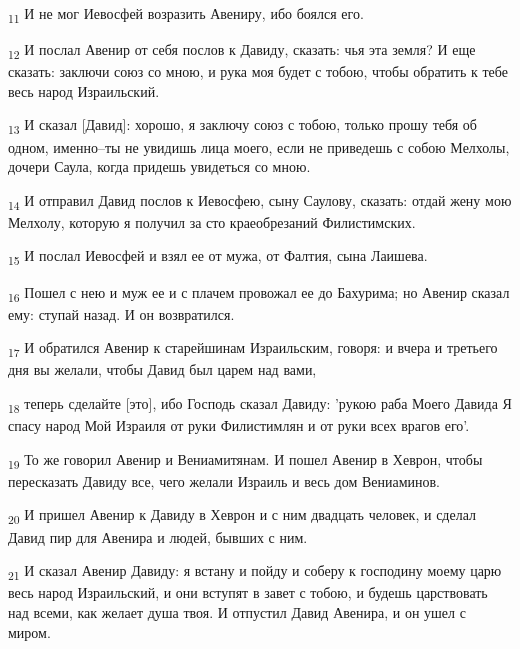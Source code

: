 \begin{tcolorbox}
\textsubscript{11} И не мог Иевосфей возразить Авениру, ибо боялся его.
\end{tcolorbox}
\begin{tcolorbox}
\textsubscript{12} И послал Авенир от себя послов к Давиду, сказать: чья эта земля? И еще сказать: заключи союз со мною, и рука моя будет с тобою, чтобы обратить к тебе весь народ Израильский.
\end{tcolorbox}
\begin{tcolorbox}
\textsubscript{13} И сказал [Давид]: хорошо, я заключу союз с тобою, только прошу тебя об одном, именно--ты не увидишь лица моего, если не приведешь с собою Мелхолы, дочери Саула, когда придешь увидеться со мною.
\end{tcolorbox}
\begin{tcolorbox}
\textsubscript{14} И отправил Давид послов к Иевосфею, сыну Саулову, сказать: отдай жену мою Мелхолу, которую я получил за сто краеобрезаний Филистимских.
\end{tcolorbox}
\begin{tcolorbox}
\textsubscript{15} И послал Иевосфей и взял ее от мужа, от Фалтия, сына Лаишева.
\end{tcolorbox}
\begin{tcolorbox}
\textsubscript{16} Пошел с нею и муж ее и с плачем провожал ее до Бахурима; но Авенир сказал ему: ступай назад. И он возвратился.
\end{tcolorbox}
\begin{tcolorbox}
\textsubscript{17} И обратился Авенир к старейшинам Израильским, говоря: и вчера и третьего дня вы желали, чтобы Давид был царем над вами,
\end{tcolorbox}
\begin{tcolorbox}
\textsubscript{18} теперь сделайте [это], ибо Господь сказал Давиду: 'рукою раба Моего Давида Я спасу народ Мой Израиля от руки Филистимлян и от руки всех врагов его'.
\end{tcolorbox}
\begin{tcolorbox}
\textsubscript{19} То же говорил Авенир и Вениамитянам. И пошел Авенир в Хеврон, чтобы пересказать Давиду все, чего желали Израиль и весь дом Вениаминов.
\end{tcolorbox}
\begin{tcolorbox}
\textsubscript{20} И пришел Авенир к Давиду в Хеврон и с ним двадцать человек, и сделал Давид пир для Авенира и людей, бывших с ним.
\end{tcolorbox}
\begin{tcolorbox}
\textsubscript{21} И сказал Авенир Давиду: я встану и пойду и соберу к господину моему царю весь народ Израильский, и они вступят в завет с тобою, и будешь царствовать над всеми, как желает душа твоя. И отпустил Давид Авенира, и он ушел с миром.
\end{tcolorbox}

